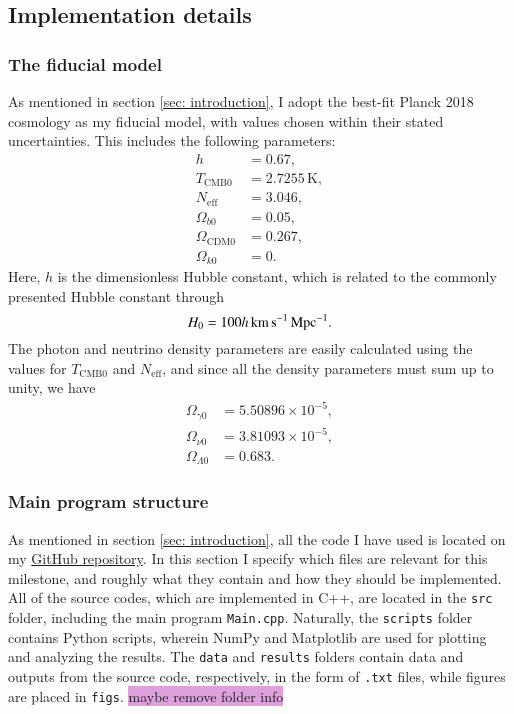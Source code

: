 \documentclass{aa}
\numberwithin{equation}{section}
\numberwithin{table}{section}
\numberwithin{figure}{section}
\begin{document}
\subsection{Implementation details}\label{subsec: I methods}
\subsubsection{The fiducial model}\label{subsubsec: I methods fiducial}
As mentioned in section \ref{sec: introduction}, I adopt the best-fit Planck 2018 cosmology \citep[see][]{Planck} as my fiducial model, with values chosen within their stated uncertainties. This includes the following parameters:
\begin{align*}
    h &= 0.67,
    \\
    T_{\text{CMB}0} &= 2.7255\,\text{K},
    \\
    N_\text{eff} &= 3.046,
    \\
    \Omega_{b0} &= 0.05,
    \\
    \Omega_{\text{CDM}0} &= 0.267,
    \\
    \Omega_{k0} &= 0.
\end{align*}
Here, $h$ is the dimensionless Hubble constant, which is related to the commonly presented Hubble constant through
\begin{equation}
    H_0 = 100h\,\text{km\,s}^{-1}\text{\,Mpc}^{-1}.
\end{equation}
The photon and neutrino density parameters are easily calculated using the values for $T_{\text{CMB}0}$ and $N_\text{eff}$, and since all the density parameters must sum up to unity, we have
\begin{align*}
  \Omega_{\gamma0} &= 5.50896\times10^{-5},
  \\
  \Omega_{\nu0} &=  3.81093\times10^{-5},
  \\
  \Omega_{\Lambda0} &= 0.683.
\end{align*}


\subsubsection{Main program structure}
As mentioned in section \ref{sec: introduction}, all the code I have used is located on my \href{https://github.com/paljettrosa/AST5220}{GitHub repository}. In this section I specify which files are relevant for this milestone, and roughly what they contain and how they should be implemented. All of the source codes, which are implemented in C++, are located in the \verb|src| folder, including the main program \verb|Main.cpp|. Naturally, the \verb|scripts| folder contains Python scripts, wherein NumPy and Matplotlib are used for plotting and analyzing the results. The \verb|data| and \verb|results| folders contain data and outputs from the source code, respectively, in the form of \verb|.txt| files, while figures are placed in \verb|figs|. \colorbox{Plum}{maybe remove folder info}
\end{document}

